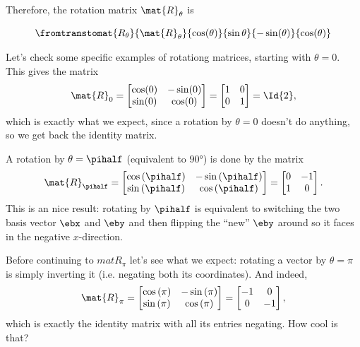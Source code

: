 Therefore, the rotation matrix $\mat{R}_{\theta}$ is

\begin{equation}
	\fromtranstomat{R_{\theta}}{\mat{R}_{\theta}}{\cos(\theta)}{\sin{\theta}}{-\sin(\theta)}{\cos(\theta)}
	\label{eq:2d rotation matrix}
\end{equation}

Let's check some specific examples of rotationg matrices, starting with $\theta=0$. This gives the matrix
\begin{equation}
	\mat{R}_{0} = \begin{bmatrix} \cos(0) & -\sin(0) \\ \sin(0) & \cos(0) \end{bmatrix} = \begin{bmatrix} 1 & 0 \\ 0 & 1 \end{bmatrix} = \Id{2},
	\label{eq:rotation by angle 0}
\end{equation}
which is exactly what we expect, since a rotation by $\theta=0$ doesn't do anything, so we get back the identity matrix.

A rotation by $\theta=\pihalf$ (equivalent to $\ang{90}$) is done by the matrix
\begin{equation}
	\mat{R}_{\pihalf} = \begin{bmatrix} \cos\left(\pihalf\right) & -\sin\left(\pihalf\right) \\ \sin\left(\pihalf\right) & \cos\left(\pihalf\right) \end{bmatrix} = \begin{bmatrix} 0 & -1 \\ 1 & 0 \end{bmatrix}.
	\label{eq:rotation by angle 90}
\end{equation}
This is an nice result: rotating by $\pihalf$ is equivalent to switching the two basis vector $\ebx$ and $\eby$ and then flipping the \enquote{new} $\eby$ around so it faces in the negative $x$-direction.

Before continuing to $mat{R}_{\pi}$ let's see what we expect: rotating a vector by $\theta=\pi$ is simply inverting it (i.e. negating both its coordinates). And indeed,
\begin{equation}
	\mat{R}_{\pi} = \begin{bmatrix} \cos\left(\pi\right) & -\sin\left(\pi\right) \\ \sin\left(\pi\right) & \cos\left(\pi\right) \end{bmatrix} = \begin{bmatrix} -1 & 0 \\ 0 & -1 \end{bmatrix},
	\label{eq:rotation by angle 180}
\end{equation}
which is exactly the identity matrix with all its entries negating. How cool is that?

